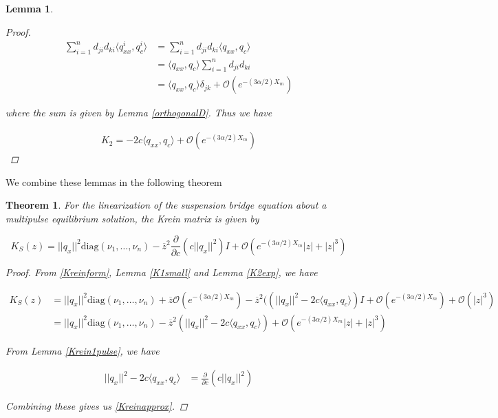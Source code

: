 \documentclass[12pt]{article}
\newtheorem{lemma}{Lemma}
\newtheorem{theorem}{Theorem}
\begin{document}
\begin{lemma}
\begin{proof}
\begin{align*}
\sum_{i = 1}^{n} d_{ji} d_{ki} \langle q^i_{xx}, q^i_c \rangle &= \sum_{i = 1}^{n} d_{ji} d_{ki} \langle q_{xx}, q_c \rangle \\
&= \langle q_{xx}, q_c \rangle \sum_{i = 1}^{n} d_{ji} d_{ki} \\
&= \langle q_{xx}, q_c \rangle \delta_{jk} + \mathcal{O}(e^{-(3 \alpha/2) X_m})
\end{align*}

where the sum is given by Lemma \ref{orthogonalD}. Thus we have

\begin{align*}
K_2 = -2c \langle q_{xx}, q_c \rangle + \mathcal{O}(e^{-(3\alpha /2)X_m})
\end{align*}

\end{proof}
\end{lemma}

We combine these lemmas in the following theorem

\begin{theorem}
For the linearization of the suspension bridge equation about a multipulse equilibrium solution, the Krein matrix is given by

\begin{equation}\label{Kreinapprox}
K_S(z) = ||q_x||^2 \text{diag}(\nu_1, \dots, \nu_n)
 - \overline{z}^2 \frac{\partial}{\partial c} \left( c||q_x||^2 \right) I + \mathcal{O}(e^{-(3 \alpha/2) X_m}|z| + |z|^3)
\end{equation}

\begin{proof}

From \eqref{Kreinform}, Lemma \ref{K1small} and Lemma \ref{K2exp}, we have

\begin{align*}
K_S(z) &= ||q_x||^2 \text{diag}(\nu_1, \dots, \nu_n) + \overline{z} \mathcal{O} (e^{-(3 \alpha/2) X_m})
 - \overline{z}^2 ( (||q_x||^2 - 2c \langle q_{xx}, q_c \rangle)I + \mathcal{O}(e^{-(3 \alpha/2) X_m}) + \mathcal{O}(|z|^3) \\
 &= ||q_x||^2 \text{diag}(\nu_1, \dots, \nu_n) 
 - \overline{z}^2 ( ||q_x||^2 - 2c \langle q_{xx}, q_c \rangle) + \mathcal{O}(e^{-(3 \alpha/2) X_m}|z| + |z|^3)
\end{align*}

From Lemma \ref{Krein1pulse}, we have

\begin{align*}
||q_x||^2 - 2c \langle q_{xx}, q_c \rangle 
&= \frac{\partial}{\partial c} \left( c||q_x||^2 \right)
\end{align*}

Combining these gives us \eqref{Kreinapprox}. 

\end{proof}
\end{theorem}
\end{document}

